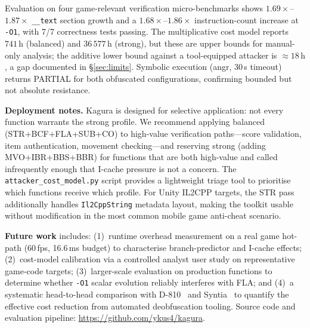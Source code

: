 \documentclass[conference]{IEEEtran}
\begin{document}
Evaluation on four game-relevant verification micro-benchmarks shows
$1.69\times$--$1.87\times$ \texttt{\_\_text} section growth and a
$1.68\times$--$1.86\times$ instruction-count increase at \texttt{-O1},
with 7/7 correctness tests passing.
The multiplicative cost model reports $741\,\text{h}$ (balanced) and
$36\,577\,\text{h}$ (strong), but these are upper bounds for
manual-only analysis; the additive lower bound against a tool-equipped
attacker is ${\approx}18\,\text{h}$, a gap documented in
\S\ref{sec:limits}.
Symbolic execution (angr, 30\,s timeout) returns PARTIAL for both
obfuscated configurations, confirming bounded but not absolute resistance.

\textbf{Deployment notes.}
Kagura is designed for selective application: not every function warrants
the strong profile.
We recommend applying balanced (STR+BCF+FLA+SUB+CO) to high-value
verification paths---score validation, item authentication, movement
checking---and reserving strong (adding MVO+IBR+BBS+BBR) for functions
that are both high-value and called infrequently enough that I-cache
pressure is not a concern.
The \texttt{attacker\_cost\_model.py} script provides a lightweight
triage tool to prioritise which functions receive which profile.
For Unity IL2CPP targets, the STR pass additionally handles
\texttt{Il2CppString} metadata layout, making the toolkit usable without
modification in the most common mobile game anti-cheat scenario.

\textbf{Future work} includes: (1)~runtime overhead measurement on a
real game hot-path (60\,fps, 16.6\,ms budget) to characterise
branch-predictor and I-cache effects; (2)~cost-model calibration via a
controlled analyst user study on representative game-code targets;
(3)~larger-scale evaluation on production functions to determine whether
\texttt{-O1} scalar evolution reliably interferes with FLA; and
(4)~a systematic head-to-head comparison with D-810~\cite{liu2017d810}
and Syntia~\cite{blazytko2017syntia} to quantify the effective cost
reduction from automated deobfuscation tooling.
Source code and evaluation pipeline: \url{https://github.com/ykus4/kagura}.



\end{document}
